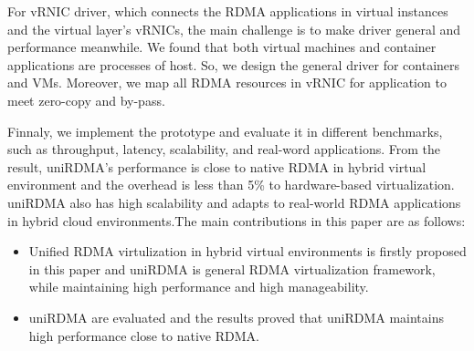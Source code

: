 For vRNIC driver, which connects the RDMA applications in virtual instances and the virtual layer's vRNICs, the main challenge is to make driver general and performance meanwhile. We found that both virtual machines and container applications are processes of host. So, we design the general driver for containers and VMs. Moreover, we map all RDMA resources in vRNIC for application to meet zero-copy and by-pass. 

Finnaly, we implement the prototype and evaluate it in different benchmarks, such as throughput, latency, scalability, and real-word applications. From the result, uniRDMA's performance is close to native RDMA in hybrid virtual environment and the overhead is less than 5\% to hardware-based virtualization. uniRDMA also has high scalability and adapts to real-world RDMA applications in hybrid cloud environments.The main contributions in this paper are as follows:

\begin{itemize}
\item Unified RDMA virtulization in hybrid virtual environments is firstly proposed in this paper and uniRDMA is general RDMA virtualization framework,  while maintaining high performance and high manageability.

\item uniRDMA are evaluated and the results proved that uniRDMA maintains high performance close to native RDMA.
\end{itemize}
